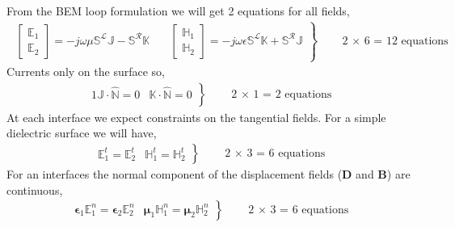 \documentclass{article}
\newcommand{\D}{\mathbf{D}}
\newcommand{\B}{\mathbf{B}}
\renewcommand{\L}{\mathbf{\mathcal{L}}}
\newcommand{\R}{\mathbf{\mathcal{R}}}
\newcommand{\0}{\varnothing}
\newcommand{\Ieps}{\bm{\epsilon}}
\newcommand{\Imu}{\bm{\mu}}
\newcommand{\Ev}{\mathbb{E}}
\newcommand{\Jv}{\mathbb{J}}
\newcommand{\Hv}{\mathbb{H}}
\newcommand{\Kv}{\mathbb{K}}
\newcommand{\SLm}{\mathbb{S}^\L}
\newcommand{\SRm}{\mathbb{S}^\R}
\newcommand{\N}{\mathbb{\hat N}}
\begin{document}
From the BEM loop formulation we will get 2 equations for all fields,
\begin{align} \label{Eq:BEMOper0}
\left.
\begin{array}{cc}
    \left[\begin{array}{c}\Ev_1\\\Ev_2\end{array}\right]
    = -j\omega\mu \SLm \Jv - \SRm \Kv & \quad
    \left[\begin{array}{c}\Hv_1\\\Hv_2\end{array}\right]
     = -j\omega\epsilon \SLm \Kv + \SRm \Jv
    \end{array}
    \right\}\quad\quad\text{2 $\times$ 6 = 12 equations}
\end{align}
Currents only on the surface so,
\begin{align} \label{Eq:CurrNormalDot}
\left.
    \begin{array}{cc}1
    \Jv \cdot \N = 0 & 
    \Kv \cdot \N = 0 \\
    \end{array}
 \right\}\quad\quad\text{2 $\times$ 1 =  2 equations}  
 \end{align}
 At each interface we expect constraints on the tangential fields. For a simple dielectric surface we will have,
\begin{align}\label{Eq:TangCont}
\left.
    \begin{array}{cc}
    \Ev^t_{1} = \Ev^t_{2} &
    \Hv^t_{1} = \Hv^t_{2} 
    \end{array}
 \right\}\quad\quad\text{2 $\times$ 3 =  6 equations}  
\end{align}
For an interfaces the normal component of the displacement fields ($\D$ and $\B$) are continuous, 
\begin{align}\label{Eq:NormalCont}
\left.
    \begin{array}{cc}
    \Ieps_1 \Ev^n_1  = \Ieps_2 \Ev^n_2 &
    \Imu_1 \Hv^n_1  = \Imu_2 \Hv^n_2
    \end{array}
    \right\}\quad\quad\text{2 $\times$ 3 =  6 equations}  
\end{align}
\end{document}
